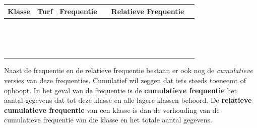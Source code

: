 \documentclass[11pt]{article}
\begin{document}
\begin{center}
  \begin{tabular}{|p{2cm}|p{2cm}|p{2cm}|p{2cm}|p{2cm}|p{2cm}|}
    \hline
    Klasse & Turf & Frequentie &&Relatieve Frequentie&\\
    \hline&&&&&\\\hline&&&&&\\\hline&&&&&\\\hline&&&&&\\\hline&&&&&\\
    \hline&&&&&\\\hline&&&&&\\\hline&&&&&\\\hline&&&&&\\\hline&&&&&\\
    \hline&&&&&\\\hline&&&&&\\\hline&&&&&\\\hline&&&&&\\\hline&&&&&\\\hline
  \end{tabular}
\end{center}

Naast de frequentie en de relatieve frequentie bestaan er ook nog de {\it cumulatieve} versies van deze frequenties. Cumulatief wil zeggen dat iets steeds toeneemt of ophoopt. In het geval van de frequentie is de {\bf cumulatieve frequentie} het aantal gegevens dat tot deze klasse en alle lagere klassen behoord. De {\bf relatieve cumulatieve frequentie} van een klasse is dan de verhouding van de cumulatieve frequentie van die klasse en het totale aantal gegevens.
\end{document}
